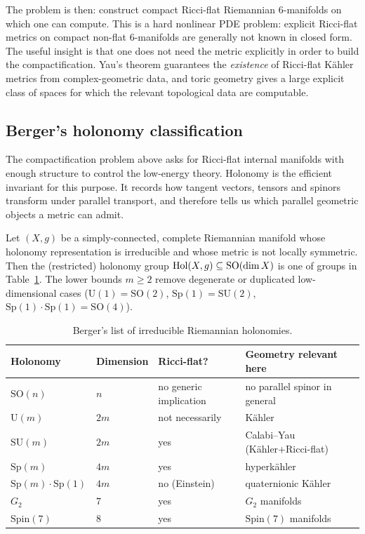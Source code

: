 The problem is then: construct compact Ricci-flat Riemannian
$6$-manifolds on which one can compute. This is a hard nonlinear PDE
problem: explicit Ricci-flat metrics on compact non-flat
$6$-manifolds are generally not known in closed form. The useful
insight is that one does not need the metric explicitly in order to
build the compactification. Yau's theorem guarantees the
\emph{existence} of Ricci-flat K\"ahler metrics from
complex-geometric data, and toric geometry gives a large explicit
class of spaces for which the relevant topological data are
computable.

\subsection{Berger's holonomy classification}\label{ssec:L1-berger}

The compactification problem above asks for Ricci-flat internal
manifolds with enough structure to control the low-energy theory.
Holonomy is the efficient invariant for this purpose. It records how
tangent vectors, tensors and spinors transform under parallel
transport, and therefore tells us which parallel geometric objects a
metric can admit. 

\begin{theorem}\label{thm:berger}
Let $(X,g)$ be a simply-connected, complete Riemannian manifold
whose holonomy representation is irreducible and whose metric is
not locally symmetric. Then the (restricted) holonomy group
$\mathrm{Hol}(X,g)\subseteq\mathrm{SO}(\dim X)$ is one
of groups in Table~\ref{tab:berger}.
The lower bounds $m\geq 2$ remove degenerate or duplicated
low-dimensional cases ($\mathrm{U}(1)=\mathrm{SO}(2)$,
$\mathrm{Sp}(1)=\mathrm{SU}(2)$,
$\mathrm{Sp}(1)\!\cdot\!\mathrm{Sp}(1)=\mathrm{SO}(4)$).
\end{theorem}

\begin{table}[t!]
\begin{center}
\begin{tabular}{llll}
\toprule
Holonomy & Dimension & Ricci-flat? & Geometry relevant here \\
\midrule
$\mathrm{SO}(n)$ & $n$ & no generic implication & no parallel spinor in general \\
$\mathrm{U}(m)$ & $2m$ & not necessarily & K\"ahler \\
$\mathrm{SU}(m)$ & $2m$ & yes & Calabi--Yau (Kähler+Ricci-flat) \\
$\mathrm{Sp}(m)$ & $4m$ & yes & hyperk\"ahler \\
$\mathrm{Sp}(m)\!\cdot\!\mathrm{Sp}(1)$ & $4m$ & no (Einstein) & quaternionic K\"ahler \\
$G_2$ & $7$ & yes & $G_2$ manifolds \\
$\mathrm{Spin}(7)$ & $8$ & yes & $\mathrm{Spin}(7)$ manifolds \\
\bottomrule
\end{tabular}
\end{center}
\caption{Berger's list of irreducible
Riemannian holonomies.}\label{tab:berger} 
\end{table}


